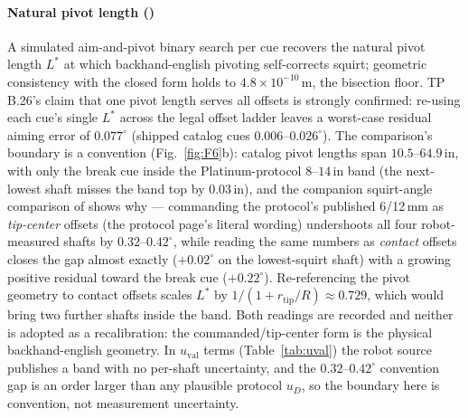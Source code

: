 \paragraph{Natural pivot length ()}
A simulated aim-and-pivot binary search per cue recovers the natural
pivot length $L^{*}$ at which backhand-english pivoting self-corrects
squirt; geometric consistency with the closed form holds to
$4.8 \times 10^{-10}$\,m, the bisection floor. TP B.26's claim that one
pivot length serves all offsets is strongly confirmed: re-using each
cue's single $L^{*}$ across the legal offset ladder leaves a worst-case
residual aiming error of $0.077^\circ$ (shipped catalog cues
$0.006$--$0.026^\circ$). The comparison's boundary is a convention
(Fig.~\ref{fig:F6}b): catalog pivot lengths span $10.5$--$64.9$\,in,
with only the break cue inside the Platinum-protocol $8$--$14$\,in band
(the next-lowest shaft misses the band top by 0.03\,in), and the
companion squirt-angle comparison of  shows why --- commanding
the protocol's published 6/12\,mm as \emph{tip-center} offsets (the
protocol page's literal wording) undershoots all four robot-measured
shafts by $0.32$--$0.42^\circ$, while reading the same numbers as
\emph{contact} offsets closes the gap almost exactly ($+0.02^\circ$ on
the lowest-squirt shaft) with a growing positive residual toward the
break cue ($+0.22^\circ$). Re-referencing the pivot geometry to contact
offsets scales $L^{*}$ by $1/(1 + r_{\mathrm{tip}}/R) \approx 0.729$,
which would bring two further shafts inside the band. Both readings are
recorded and neither is adopted as a recalibration: the
commanded/tip-center form is the physical backhand-english geometry. In $u_{\mathrm{val}}$ terms
(Table~\ref{tab:uval}) the robot source publishes a band with no
per-shaft uncertainty, and the $0.32$--$0.42^\circ$ convention gap is an
order larger than any plausible protocol $u_D$, so the boundary here is
convention, not measurement uncertainty.

